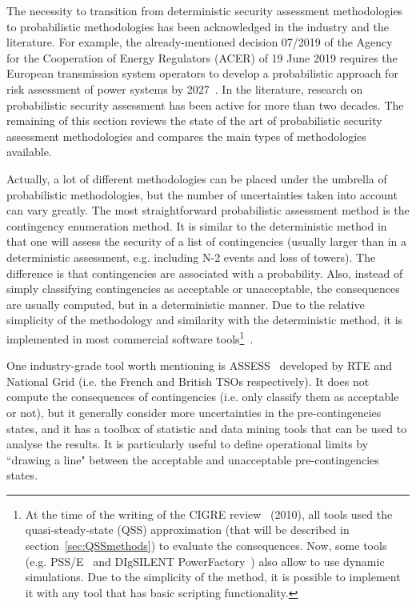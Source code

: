 The necessity to transition from deterministic security assessment methodologies to probabilistic methodologies has been acknowledged in the industry and the literature. For example, the already-mentioned decision 07/2019 of the Agency for the Cooperation of Energy Regulators (ACER) of 19 June 2019 requires the European transmission system operators to develop a probabilistic approach for risk assessment of power systems by 2027~\cite{ACER}. In the literature, research on probabilistic security assessment has been active for more than two decades. The remaining of this section reviews the state of the art of probabilistic security assessment methodologies and compares the main types of methodologies available.

Actually, a lot of different methodologies can be placed under the umbrella of probabilistic methodologies, but the number of uncertainties taken into account can vary greatly. The most straightforward probabilistic assessment method is the contingency enumeration method. It is similar to the deterministic method in that one will assess the security of a list of contingencies (usually larger than in a deterministic assessment, e.g. including N-2 events and loss of towers). The difference is that contingencies are associated with a probability. Also, instead of simply classifying contingencies as acceptable or unacceptable, the consequences are usually computed, but in a deterministic manner. Due to the relative simplicity of the methodology and similarity with the deterministic method, it is implemented in most commercial software tools\footnote{At the time of the writing of the CIGRE review~\cite{CIGREreviewOfTools} (2010), all tools used the quasi-steady-state (QSS) approximation (that will be described in section~\ref{sec:QSSmethods}) to evaluate the consequences. Now, some tools (e.g. PSS/E~\cite{PSSE} and DIgSILENT PowerFactory~\cite{PowerFactory}) also allow to use dynamic simulations. Due to the simplicity of the method, it is possible to implement it with any tool that has basic scripting functionality.}~\cite{CIGREreviewOfTools}.

One industry-grade tool worth mentioning is ASSESS~\cite{AssessRTE, AssessNationalGrid} developed by RTE and National Grid (i.e. the French and British TSOs respectively). It does not compute the consequences of contingencies (i.e. only classify them as acceptable or not), but it generally consider more uncertainties in the pre-contingencies states, and it has a toolbox of statistic and data mining tools that can be used to analyse the results. It is particularly useful to define operational limits by ``drawing a line" between the acceptable and unacceptable pre-contingencies states.

